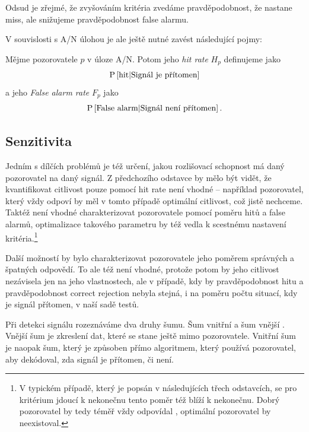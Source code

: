 Odsud je zřejmé, že zvyšováním kritéria zvedáme pravděpodobnost, že nastane
miss, ale snižujeme pravděpodobnost false alarmu.

V souvislosti s A/N úlohou je ale ještě nutné zavést následující pojmy:

\begin{definice}\label{hitrate}
Mějme pozorovatele $p$ v úloze A/N. Potom jeho \emph{hit rate\/} $H_p$ definujeme jako $$\P{\text{hit}|\text{Signál je přítomen}}$$ a jeho \emph{False alarm rate\/} $F_p$ jako $$\P{\text{False alarm}|\text{Signál není přítomen}}.$$
\end{definice}

\subsection{Senzitivita}

Jedním s dílčích problémů je též určení, jakou rozlišovací schopnost má daný
pozorovatel na daný signál. Z předchozího odstavce by mělo být vidět, že
kvantifikovat citlivost pouze pomocí hit rate není vhodné -- například pozorovatel, který vždy odpoví
 by měl v tomto případě optimální citlivost, což jistě nechceme. Taktéž
není vhodné charakterizovat pozorovatele pomocí poměru hitů a false alarmů,
optimalizace takového parametru by též vedla k scestnému nastavení
kritéria.\footnote{V typickém případě, který je popsán v následujících třech
odstavcích, se pro kritérium jdoucí k nekonečnu tento poměr též blíží k
nekonečnu. Dobrý pozorovatel by tedy téměř vždy odpovídal , optimální
pozorovatel by neexistoval.}

Další možností by bylo charakterizovat pozorovatele jeho poměrem správných
a špatných odpovědí. To ale též není vhodné, protože potom by jeho citlivost
nezávisela jen na jeho vlastnostech, ale v případě, kdy by pravděpodobnost hitu
a pravděpodobnost correct rejection nebyla stejná, i na poměru počtu situací,
kdy je signál přítomen, v naší sadě testů.

Při detekci signálu rozeznáváme dva druhy šumu. Šum vnitřní a šum vnější \citep{DavidSDT}.
Vnější šum je zkreslení dat, které se stane ještě mimo pozorovatele. Vnitřní
šum je naopak šum, který je způsoben přímo algoritmem, který používá
pozorovatel, aby dekódoval, zda signál je přítomen, či není.

